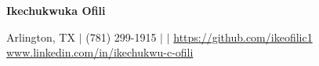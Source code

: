 \begin{center}
{\huge \textbf{Ikechukwuka Ofili}}
\end{center}    

\begin{center}
Arlington, TX $\vert$ (781) 299-1915 $\vert$  $\vert$ \url{https://github.com/ikeofilic1}\\
\url{www.linkedin.com/in/ikechukwu-c-ofili}
\end{center}
